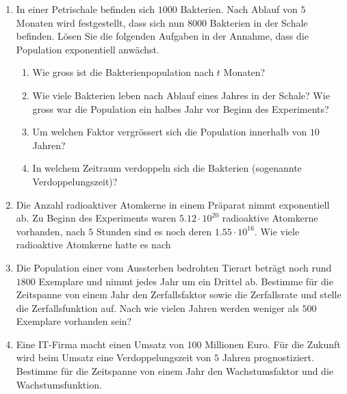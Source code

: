 \documentclass[11pt,oneside]{article}
\begin{document}
\begin{aufgabe}
\begin{enumerate}
\begin{table}[H]
			\end{table}
			\begin{table}[H]
				\centering
				\begin{tabular}{c|p{8mm}|p{8mm}|p{8mm}|p{8mm}|p{8mm}|p{8mm}|p{8mm}|p{8mm}}
					$t$ & $0$ & $1$ & $2$ & $3$ & $4$ & $5$ & $6$ & $t$ \\\hline
					$k(t)$ & & & $2$ & & $18$ & $54$ & &
				\end{tabular}
			\end{table}
			\endgroup
			\item In einer Petrischale befinden sich $1000$ Bakterien.  Nach Ablauf von $5$ Monaten wird festgestellt, dass sich nun $8000$ Bakterien in der Schale befinden. Lösen Sie die folgenden Aufgaben in der Annahme, dass die Population exponentiell anwächst.
			\begin{enumerate}[label=\alph*)]
				\item Wie gross ist die Bakterienpopulation nach $t$ Monaten?
				\item Wie viele Bakterien leben nach Ablauf eines Jahres in der Schale? Wie gross war die Population ein halbes Jahr vor Beginn des Experiments?
				\item Um welchen Faktor vergrössert sich die Population innerhalb von $10$ Jahren?
				\item In welchem Zeitraum verdoppeln sich die Bakterien (sogenannte Verdoppelungszeit)?
			\end{enumerate}
			\item 	Die Anzahl radioaktiver Atomkerne in einem Präparat nimmt exponentiell ab. Zu Beginn des Experiments waren $5.12\cdot 10^{20}$ radioaktive Atomkerne vorhanden, nach $5$ Stunden sind es noch deren $1.55\cdot 10^{16}$. Wie viele radioaktive Atomkerne hatte es nach
			\item Die Population einer vom Aussterben bedrohten Tierart beträgt noch rund $1800$ Exemplare und nimmt jedes Jahr um ein Drittel ab. Bestimme für die Zeitspanne von einem Jahr den Zerfallsfaktor sowie die Zerfallsrate und stelle die Zerfallsfunktion auf. Nach wie vielen Jahren werden weniger als $500$ Exemplare vorhanden sein?
			\item Eine IT-Firma macht einen Umsatz von 100 Millionen Euro. Für die Zukunft wird beim Umsatz eine Verdoppelungszeit von $5$ Jahren prognostiziert. Bestimme für die Zeitspanne von einem Jahr den Wachstumsfaktor und die Wachstumsfunktion.

\end{enumerate}
\end{aufgabe}
\end{document}
